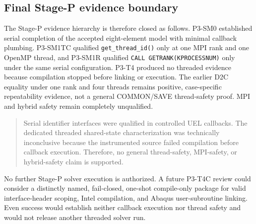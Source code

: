 \subsection{Final Stage-P evidence boundary}

The Stage-P evidence hierarchy is therefore closed as follows.  P3-SM0
established serial completion of the accepted eight-element model with minimal
callback plumbing.  P3-SM1TC qualified \texttt{get\_thread\_id()} only at one
MPI rank and one OpenMP thread, and P3-SM1R qualified
\texttt{CALL GETRANK(KPROCESSNUM)} only under the same serial configuration.
P3-T4 produced no threaded evidence because compilation stopped before
linking or execution.  The earlier D2C equality under one rank and four
threads remains positive, case-specific repeatability evidence, not a general
COMMON/SAVE thread-safety proof.  MPI and hybrid safety remain completely
unqualified.

\begin{quote}
Serial identifier interfaces were qualified in controlled UEL callbacks. The
dedicated threaded shared-state characterization was technically inconclusive
because the instrumented source failed compilation before callback execution.
Therefore, no general thread-safety, MPI-safety, or hybrid-safety claim is
supported.
\end{quote}

No further Stage-P solver execution is authorized.  A future P3-T4C review
could consider a distinctly named, fail-closed, one-shot compile-only package
for valid interface-header scoping, Intel compilation, and Abaqus
user-subroutine linking.  Even success would establish neither callback
execution nor thread safety and would not release another threaded solver run.
